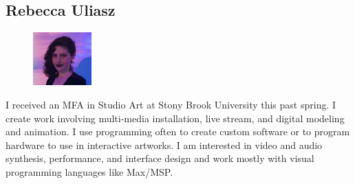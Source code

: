 \documentclass[]{article}
\begin{document}
\vspace{0.5 in}

\subsection*{Rebecca Uliasz} 
\begin{figure}
\begin{centering}
    \includegraphics[width=0.2\textwidth]{rebecca.jpg}
\end{centering}
\end{figure}
I received an MFA in Studio Art at Stony Brook University this past spring. I create work involving multi-media installation, live stream, and digital modeling and animation. I use programming often to create custom software or to program hardware to use in interactive artworks. I am interested in video and audio synthesis, performance, and interface design and work mostly with visual programming languages like Max/MSP. 
\end{document}
